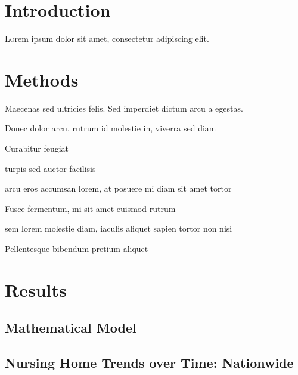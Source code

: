\documentclass[twoside]{article}
\begin{document}
\begin{multicols}{2} %

\section{Introduction}

\lettrine[nindent=0em,lines=3]{L} orem ipsum dolor sit amet, consectetur adipiscing elit.
\lipsum[2-3] %


\section{Methods}

Maecenas sed ultricies felis. Sed imperdiet dictum arcu a egestas. 
\begin{compactitem}
\item Donec dolor arcu, rutrum id molestie in, viverra sed diam
\item Curabitur feugiat
\item turpis sed auctor facilisis
\item arcu eros accumsan lorem, at posuere mi diam sit amet tortor
\item Fusce fermentum, mi sit amet euismod rutrum
\item sem lorem molestie diam, iaculis aliquet sapien tortor non nisi
\item Pellentesque bibendum pretium aliquet
\end{compactitem}
\lipsum[4] %


\section{Results}
\subsection{Mathematical Model}

\subsection{Nursing Home Trends over Time: Nationwide}


\end{multicols}
\end{document}
